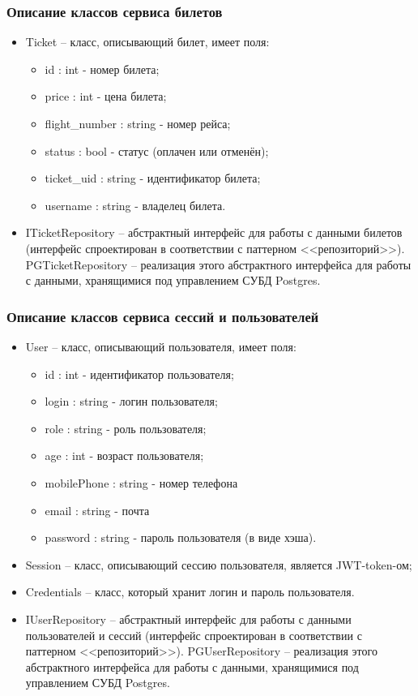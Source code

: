 \subsubsection{Описание классов сервиса билетов}

\begin{itemize}
    \item Ticket -- класс, описывающий билет, имеет поля:
    \begin{itemize}

        \item id : int - номер билета;
        \item price : int - цена билета;
        \item flight\_number : string - номер рейса;
        \item status : bool - статус (оплачен или отменён);
        \item ticket\_uid : string - идентификатор билета;
        \item username : string - владелец билета.
    \end{itemize}
    \item ITicketRepository -- абстрактный интерфейс для работы с данными билетов (интерфейс спроектирован в соответствии с паттерном <<репозиторий>>). PGTicketRepository -- реализация этого абстрактного интерфейса для работы с данными, хранящимися под управлением СУБД Postgres.
\end{itemize}

\subsubsection{Описание классов сервиса сессий и пользователей}

\begin{itemize}
    \item User -- класс, описывающий пользователя, имеет поля:
    \begin{itemize}
        \item id : int - идентификатор пользователя;
        \item login : string - логин пользователя;
        \item role : string - роль пользователя;
        \item age : int - возраст пользователя;
        \item mobilePhone : string - номер телефона
        \item email : string - почта
        \item password : string - пароль пользователя (в виде хэша).
    \end{itemize}
    \item Session -- класс, описывающий сессию пользователя, является JWT-token-ом;
    \item Credentials -- класс, который хранит логин и пароль пользователя.
    \item IUserRepository -- абстрактный интерфейс для работы с данными пользователей и сессий (интерфейс спроектирован в соответствии с паттерном <<репозиторий>>). PGUserRepository -- реализация этого абстрактного интерфейса для работы с данными, хранящимися под управлением СУБД Postgres.
\end{itemize}

